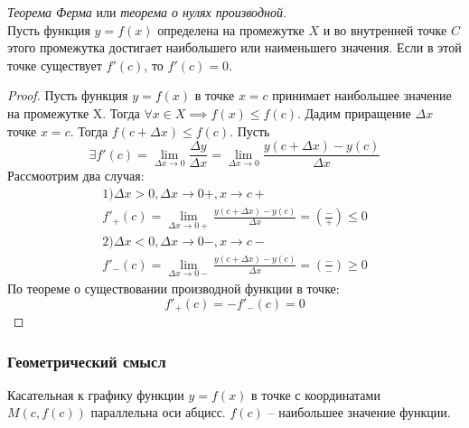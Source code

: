 \begin{theorem}
  \textit{Теорема Ферма} или \textit{теорема о нулях производной}. \\
  Пусть функция $y = f(x)$ определена на промежутке $X$ и во внутренней точке $C$ этого промежутка достигает наибольшего или наименьшего значения. Если в этой точке существует $f'(c)$, то $f'(c) = 0$.
\end{theorem}
\begin{proof}
  Пусть функция $y = f(x)$ в точке  $x = c$ принимает наибольшее значение на промежутке X. Тогда $\forall x \in X \implies f(x) \le f(c)$. Дадим приращение $\Delta x$ точке $x = c$. Тогда $f(c + \Delta x) \le f(c)$. Пусть \[
    \exists f'(c) = \lim_{\Delta x \to 0} \frac{\Delta y}{\Delta x} = \lim_{\Delta x \to 0} \frac{y(c + \Delta x) - y(c)}{\Delta x}
\]
  Рассмоотрим два случая:
  \begin{gather*}
    1) \Delta x > 0, \Delta x \to 0+, x \to c+ \\
      f'_+(c) = \lim_{\Delta x \to 0+} \frac{y(c + \Delta x) - y(c)}{\Delta x} = \left( \frac{-}{+} \right) \le 0 \\
    2) \Delta x < 0, \Delta x \to 0-, x \to c- \\
      f'_-(c) = \lim_{\Delta x \to 0-} \frac{y(c + \Delta x) - y(c)}{\Delta x} = \left( \frac{-}{-} \right) \ge 0
  \end{gather*}
  По теореме о существовании производной функции в точке: \[
  f'_+(c) = -f'_-(c) = 0
  \] 
\end{proof}

\subsubsection*{Геометрический смысл}

Касательная к графику функции $y = f(x)$ в точке с координатами $M(c, f(c))$ параллельна оси абцисс.  $f(c)$ -- наибольшее значение функции.

